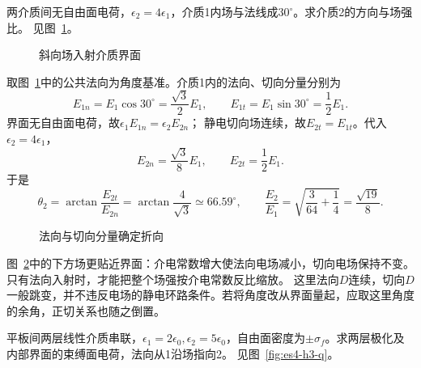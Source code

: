\begin{exercise}[电场线穿过介质界面]\label{ex:es4-h2}
两介质间无自由面电荷，$\epsilon_2=4\epsilon_1$，介质1内场与法线成$30^\circ$。求介质2的方向与场强比。 见图~\ref{fig:es4-h2-q}。
\end{exercise}

\begin{figure}[H]\centering
{}
\caption{斜向场入射介质界面}\label{fig:es4-h2-q}
\end{figure}
\begin{solution}
取图~\ref{fig:es4-h2-q}中的公共法向为角度基准。介质1内的法向、切向分量分别为
\[
 E_{1n}=E_1\cos30^\circ=\frac{\sqrt3}{2}E_1,\qquad
 E_{1t}=E_1\sin30^\circ=\frac12E_1.
\]
界面无自由面电荷，故$\epsilon_1E_{1n}=\epsilon_2E_{2n}$；
静电切向场连续，故$E_{2t}=E_{1t}$。代入$\epsilon_2=4\epsilon_1$，
\[
 E_{2n}=\frac{\sqrt3}{8}E_1,\qquad E_{2t}=\frac12E_1.
\]
于是
\[
 \boxed{\theta_2=\arctan\frac{E_{2t}}{E_{2n}}
 =\arctan\frac4{\sqrt3}\simeq66.59^\circ},\qquad
 \boxed{\frac{E_2}{E_1}
 =\sqrt{\frac3{64}+\frac14}=\frac{\sqrt{19}}8}.
\]
\begin{figure}[H]\centering
{}
\caption{法向与切向分量确定折向}\label{fig:es4-h2-s}
\end{figure}
图~\ref{fig:es4-h2-s}中的下方场更贴近界面：介电常数增大使法向电场减小，切向电场保持不变。只有法向入射时，才能把整个场强按介电常数反比缩放。
这里法向$D$连续，切向$D$一般跳变，并不违反电场的静电环路条件。若将角度改从界面量起，应取这里角度的余角，正切关系也随之倒置。
\end{solution}

\begin{exercise}[串层电容的自由与束缚界面电荷]\label{ex:es4-h3}
平板间两层线性介质串联，$\epsilon_1=2\epsilon_0,\epsilon_2=5\epsilon_0$，自由面密度为$\pm\sigma_f$。求两层极化及内部界面的束缚面电荷，法向从1沿场指向2。 见图~\ref{fig:es4-h3-q}。
\end{exercise}

